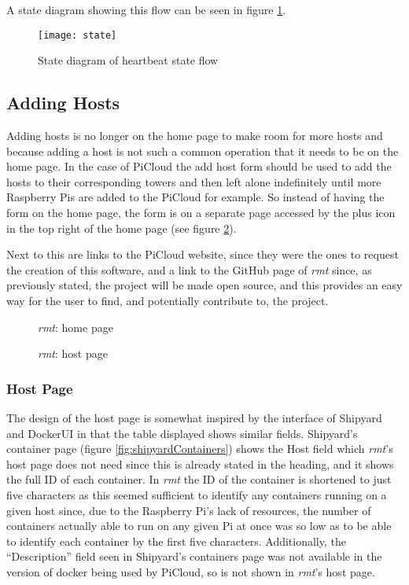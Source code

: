 A state diagram showing this flow can be seen in figure \ref{fig:hbstate}.

\begin{figure}[t]
	\centering
	\texttt{[image: state]}
	\caption{State diagram of heartbeat state flow}
	\label{fig:hbstate}
\end{figure}

\subsection{Adding Hosts}

Adding hosts is no longer on the home page to make room for more hosts and because adding a host is not such a common operation that it needs to be on the home page.
In the case of PiCloud the add host form should be used to add the hosts to their corresponding towers and then left alone indefinitely until more Raspberry Pis are added to the PiCloud for example.
So instead of having the form on the home page, the form is on a separate page accessed by the plus icon in the top right of the home page (see figure \ref{fig:rmtCurrent}).

Next to this are links to the PiCloud website, since they were the ones to request the creation of this software, and a link to the GitHub page of \emph{rmt} since, as previously stated, the project will be made open source, and this provides an easy way for the user to find, and potentially contribute to, the project.

\begin{figure}[t]
	\centering
	\setlength\fboxsep{0pt}
	\setlength\fboxrule{0.5pt}
	\caption{\emph{rmt}: home page}
	\label{fig:rmtCurrent}
\end{figure}

\begin{figure}[t]
	\centering
	\setlength\fboxsep{0pt}
	\setlength\fboxrule{0.5pt}
	\caption{\emph{rmt}: host page}
	\label{fig:rmtHostCurrent}
\end{figure}

\subsubsection{Host Page}

The design of the host page is somewhat inspired by the interface of Shipyard and DockerUI in that the table displayed shows similar fields.
Shipyard's container page (figure \ref{fig:shipyardContainers}) shows the Host field which \emph{rmt}'s host page does not need since this is already stated in the heading, and it shows the full ID of each container.
In \emph{rmt} the ID of the container is shortened to just five characters as this seemed sufficient to identify any containers running on a given host since, due to the Raspberry Pi's lack of resources, the number of containers actually able to run on any given Pi at once was so low as to be able to identify each container by the first five characters.
Additionally, the ``Description'' field seen in Shipyard's containers page was not available in the version of docker being used by PiCloud, so is not shown in \emph{rmt}'s host page.

